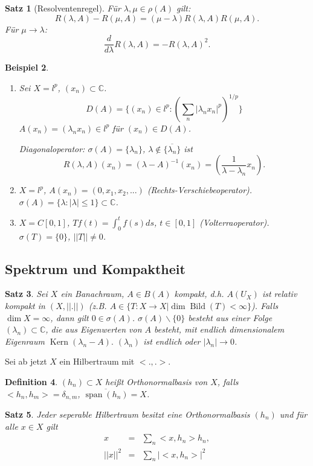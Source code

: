 \documentclass[11pt,a4paper,titlepage, ngerman]{scrartcl}
\newtheorem{Satz}{Satz}[section]
\newtheorem{Definition}[Satz]{Definition}
\newtheorem{Beispiel}[Satz]{Beispiel}
\DeclareMathOperator{\Kern}{Kern}
\DeclareMathOperator{\Bild}{Bild}
\DeclareMathOperator{\spann}{span}
\numberwithin{equation}{section}
\newcommand{\C}{\mathbb{C}} %
\begin{document}
	
	\begin{Satz}[Resolventenregel]
		Für $\lambda,\mu\in \rho(A)$ gilt:
		$$R(\lambda,A)-R(\mu,A) = (\mu-\lambda)R(\lambda,A)R(\mu,A).$$
		Für $\mu\rightarrow \lambda$:
		$$\frac{d}{d\lambda}R(\lambda,A) = -R(\lambda,A)^2.$$
	\end{Satz}
	
	\begin{Beispiel}~
		\begin{enumerate}
			\item[a)] Sei $X=l^p$, $(x_n)\subset\C$.
			$$D(A) = \{(x_n)\in l^p: (\sum_n |\lambda_n x_n|^p)^{1/p} \}$$
			$A(x_n) = (\lambda_n x_n)\in l^p$ für $(x_n)\in D(A)$.
			
			Diagonaloperator: $\sigma(A) = \{\lambda_n\}$, $\lambda\notin \overline{\{\lambda_n\}}$ ist 
			$$R(\lambda,A)(x_n) = (\lambda-A)^{-1}(x_n) = (\frac{1}{\lambda-\lambda_n}x_n).$$
			\item[b)] $X=l^p$, $A(x_n) = (0,x_1,x_2,...)$ (Rechts-Verschiebeoperator). $\sigma(A) = \{\lambda:|\lambda|\leq 1 \}\subset \C$. 
			\item[c)] $X = C[0,1]$, $Tf(t) = \int_0^t f(s)ds$, $t\in [0,1]$ (Volterraoperator). $\sigma(T) = \{0\}$, $||T|| \neq 0$.
		\end{enumerate}
	\end{Beispiel}
	
	\subsection{Spektrum und Kompaktheit}
	
	\begin{Satz}
		Sei $X$ ein Banachraum, $A\in B(A)$ kompakt, d.h. $A(U_X)$ ist relativ kompakt in $(X,||.||)$ (z.B. $A\in \{T: X\rightarrow X |\dim\Bild(T)<\infty \}$). Falls $\dim X = \infty$, dann gilt $0\in \sigma(A)$. $\sigma(A)\backslash \{0\}$ besteht aus einer Folge $(\lambda_n)\subset \C$, die aus Eigenwerten von $A$ besteht, mit endlich dimensionalem Eigenraum $\Kern(\lambda_n-A).$ $(\lambda_n)$ ist endlich oder $|\lambda_n|\rightarrow 0$.
	\end{Satz}
	
	Sei ab jetzt $X$ ein Hilbertraum mit $<.,.>$. 
	
	\begin{Definition}
		$(h_n)\subset X$ heißt Orthonormalbasis von $X$, falls $<h_n, h_m> = \delta_{n,m}$, $\overline{\spann(h_n)} = X$.
	\end{Definition}
	
	\begin{Satz}
		Jeder seperable Hilbertraum besitzt eine Orthonormalbasis $(h_n)$ und für alle $x\in X$ gilt
		\begin{eqnarray}
			x &=& \sum_n <x,h_n>h_n,\nonumber\\
			||x||^2 &=& \sum_n|<x,h_n>|^2 \nonumber
		\end{eqnarray}	
	\end{Satz}
	
\end{document}
